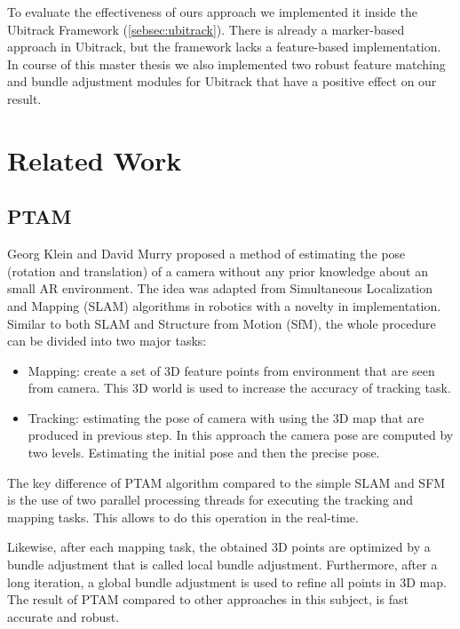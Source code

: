 To evaluate the effectiveness of ours approach we implemented it inside the Ubitrack Framework (\autoref{sebsec:ubitrack}). There is already a marker-based approach in Ubitrack, but the framework lacks a feature-based implementation. In course of this master thesis we also implemented two robust feature matching and bundle adjustment modules for Ubitrack that have a positive effect on our result.

\section{Related Work}
\subsection{PTAM}
Georg Klein and David Murry \cite{klein2007parallel} proposed a method of estimating the pose (rotation and translation) of a camera without any prior knowledge about an small AR environment. The idea was adapted from Simultaneous Localization and Mapping (SLAM) algorithms in robotics with a novelty in implementation. Similar to both SLAM and Structure from Motion (SfM), the whole procedure can be divided into two major tasks:
\begin{itemize}
\item Mapping: create a set of 3D feature points from environment that are seen from camera. This 3D world is used to increase the accuracy of tracking task.
\item Tracking: estimating the pose of camera with using the 3D map that are produced in previous step. In this approach the camera pose are computed by two levels. Estimating the initial pose and then the precise pose.
\end{itemize}
The key difference of PTAM algorithm compared to the simple SLAM and SFM is the use of two parallel processing threads for executing the tracking and mapping tasks. This allows to do this operation in the real-time.

Likewise, after each mapping task, the obtained 3D points are optimized by a bundle adjustment that is called local bundle adjustment. Furthermore, after a long iteration, a global bundle adjustment is used to refine all points in 3D map. The result of PTAM compared to other approaches in this subject, is fast accurate and robust.

